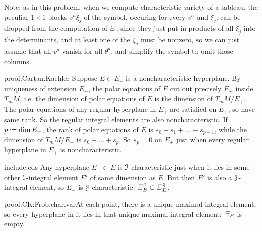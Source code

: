 Note: as in this problem, when we compute characteristic variety of a tableau, the peculiar \(1\times 1\) blocks \(v^a\xi_j\) of the symbol, occuring for every \(v^a\) and \(\xi_j\), can be dropped from the computation of \(\CV\), since they just put in products of all \(\xi_j\) into the determinants, and at least one of the \(\xi_j\) must be nonzero, so we can just assume that all \(v^a\) vanish for all \(\theta^a\), and simplify the symbol to omit those columns.
\begin{answer}{proof.Cartan.Kaehler}
Suppose \(E\subset E_+\) is a noncharacteristic hyperplane.
By uniqueness of extension \(E_+\), the polar equations of \(E\) cut out precisely \(E_+\) inside \(T_m M\), i.e. the dimension of polar equations of \(E\) is the dimension of \(T_m M/E_+\).
The polar equations of any regular hyperplane in \(E_+\) are satisfied on \(E_+\), so have same rank.
So the regular integral elements are also noncharacteristic.
If \(p\defeq\dim E_+\), the rank of polar equations of \(E\) is \(s_0+s_1+\dots+s_{p-1}\), while the dimension of \(T_m M/E_+\) is \(s_0+\dots+s_p\).
So \(s_p=0\) on \(E_+\) just when every regular hyperplane in \(E_+\) is noncharacteristic.
\end{answer}
%
\begin{answer}{include.eds}%
Any hyperplane \(E_- \subset E\) is \(\mathcal{I}\)-characteristic just when it lies in some other \(\mathcal{I}\)-integral element \(E'\) of same dimension as \(E\). But then \(E'\) is also a \(\mathcal{J}\)-integral element, so \(E_-\) is \(\mathcal{J}\)-characteristic: \(\CV^{\II}_E\subset \CV^{\JJ}_E\).%
\end{answer}
\begin{answer}{proof.CK:Frob.char.var}At each point, there is a unique maximal integral element, so every hyperplane in it lies in that unique maximal integral element: \(\CV_E\) is empty.
\end{answer}

